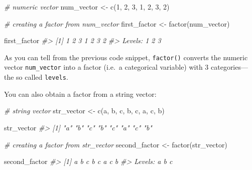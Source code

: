 \documentclass[
]{book}
\newenvironment{Shaded}{\begin{snugshade}}{\end{snugshade}}
\newcommand{\CommentTok}[1]{\textcolor[rgb]{0.56,0.35,0.01}{\textit{#1}}}
\newcommand{\DecValTok}[1]{\textcolor[rgb]{0.00,0.00,0.81}{#1}}
\newcommand{\FunctionTok}[1]{\textcolor[rgb]{0.00,0.00,0.00}{#1}}
\newcommand{\NormalTok}[1]{#1}
\newcommand{\OtherTok}[1]{\textcolor[rgb]{0.56,0.35,0.01}{#1}}
\newcommand{\StringTok}[1]{\textcolor[rgb]{0.31,0.60,0.02}{#1}}
\begin{document}
\begin{Shaded}
\begin{Highlighting}[]
\CommentTok{\# numeric vector}
\NormalTok{num\_vector }\OtherTok{\textless{}{-}} \FunctionTok{c}\NormalTok{(}\DecValTok{1}\NormalTok{, }\DecValTok{2}\NormalTok{, }\DecValTok{3}\NormalTok{, }\DecValTok{1}\NormalTok{, }\DecValTok{2}\NormalTok{, }\DecValTok{3}\NormalTok{, }\DecValTok{2}\NormalTok{)}

\CommentTok{\# creating a factor from num\_vector}
\NormalTok{first\_factor }\OtherTok{\textless{}{-}} \FunctionTok{factor}\NormalTok{(num\_vector)}

\NormalTok{first\_factor}
\CommentTok{\#\textgreater{} [1] 1 2 3 1 2 3 2}
\CommentTok{\#\textgreater{} Levels: 1 2 3}
\end{Highlighting}
\end{Shaded}

As you can tell from the previous code snippet, \texttt{factor()} converts the numeric
vector \texttt{num\_vector} into a factor (i.e.~a categorical variable) with 3
categories---the so called \texttt{levels}.

You can also obtain a factor from a string vector:

\begin{Shaded}
\begin{Highlighting}[]
\CommentTok{\# string vector}
\NormalTok{str\_vector }\OtherTok{\textless{}{-}} \FunctionTok{c}\NormalTok{(}\StringTok{\textquotesingle{}a\textquotesingle{}}\NormalTok{, }\StringTok{\textquotesingle{}b\textquotesingle{}}\NormalTok{, }\StringTok{\textquotesingle{}c\textquotesingle{}}\NormalTok{, }\StringTok{\textquotesingle{}b\textquotesingle{}}\NormalTok{, }\StringTok{\textquotesingle{}c\textquotesingle{}}\NormalTok{, }\StringTok{\textquotesingle{}a\textquotesingle{}}\NormalTok{, }\StringTok{\textquotesingle{}c\textquotesingle{}}\NormalTok{, }\StringTok{\textquotesingle{}b\textquotesingle{}}\NormalTok{)}

\NormalTok{str\_vector}
\CommentTok{\#\textgreater{} [1] "a" "b" "c" "b" "c" "a" "c" "b"}

\CommentTok{\# creating a factor from str\_vector}
\NormalTok{second\_factor }\OtherTok{\textless{}{-}} \FunctionTok{factor}\NormalTok{(str\_vector)}

\NormalTok{second\_factor}
\CommentTok{\#\textgreater{} [1] a b c b c a c b}
\CommentTok{\#\textgreater{} Levels: a b c}
\end{Highlighting}
\end{Shaded}
\end{document}
